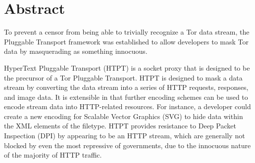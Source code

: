 \section{Abstract}
To prevent a censor from being able to trivially recognize a Tor data stream, the Pluggable Transport framework was established to allow developers to mask Tor data by masquerading as something innocuous. 

HyperText Pluggable Transport (HTPT) is a socket proxy that is designed to be the precursor of a Tor Pluggable Transport. HTPT is designed to mask a data stream by converting the data stream into a series of HTTP requests, responses, and image data. It is extensible in that further encoding schemes can be used to encode stream data into HTTP-related resources. For instance, a developer could create a new encoding for Scalable Vector Graphics (SVG) to hide data within the XML elements of the filetype. HTPT provides resistance to Deep Packet Inspection (DPI) by appearing to be an HTTP stream, which are generally not blocked by even the most repressive of governments, due to the innocuous nature of the majority of HTTP traffic. 
